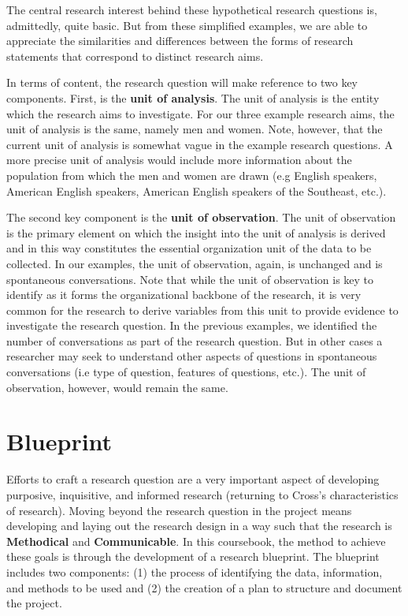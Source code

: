 \documentclass[
  letterpaper,
]{scrbook}
\begin{document}
The central research interest behind these hypothetical research
questions is, admittedly, quite basic. But from these simplified
examples, we are able to appreciate the similarities and differences
between the forms of research statements that correspond to distinct
research aims.

In terms of content, the research question will make reference to two
key components. First, is the \textbf{unit of analysis}. The unit of
analysis is the entity which the research aims to investigate. For our
three example research aims, the unit of analysis is the same, namely
men and women. Note, however, that the current unit of analysis is
somewhat vague in the example research questions. A more precise unit of
analysis would include more information about the population from which
the men and women are drawn (e.g English speakers, American English
speakers, American English speakers of the Southeast, etc.).

The second key component is the \textbf{unit of observation}. The unit
of observation is the primary element on which the insight into the unit
of analysis is derived and in this way constitutes the essential
organization unit of the data to be collected. In our examples, the unit
of observation, again, is unchanged and is spontaneous conversations.
Note that while the unit of observation is key to identify as it forms
the organizational backbone of the research, it is very common for the
research to derive variables from this unit to provide evidence to
investigate the research question. In the previous examples, we
identified the number of conversations as part of the research question.
But in other cases a researcher may seek to understand other aspects of
questions in spontaneous conversations (i.e type of question, features
of questions, etc.). The unit of observation, however, would remain the
same.

\hypertarget{blueprint}{%
\section{Blueprint}\label{blueprint}}

Efforts to craft a research question are a very important aspect of
developing purposive, inquisitive, and informed research (returning to
Cross's characteristics of research). Moving beyond the research
question in the project means developing and laying out the research
design in a way such that the research is \textbf{Methodical} and
\textbf{Communicable}. In this coursebook, the method to achieve these
goals is through the development of a research blueprint. The blueprint
includes two components: (1) the process of identifying the data,
information, and methods to be used and (2) the creation of a plan to
structure and document the project.
\end{document}
